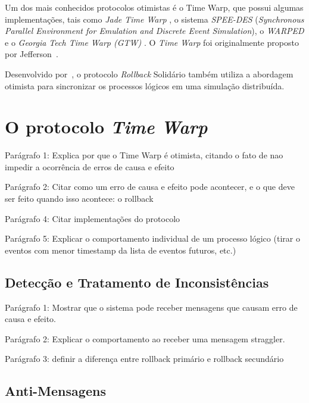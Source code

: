 
Um dos mais conhecidos protocolos otimistas é o Time Warp, que possui algumas implementações, tais como \textit{Jade Time Warp} \cite{BAEZNER1}, o sistema \textit{SPEE-DES} (\textit{Synchronous Parallel Environment for Emulation and Discrete Event Simulation})\cite{STEINMAN92}, o \textit{WARPED} \cite{WARPED} e o \textit{Georgia Tech Time Warp (GTW)} \cite{DAS94}. O \textit{Time Warp} foi originalmente proposto por Jefferson~\cite{JEFFERSON}.

Desenvolvido por~\cite{EDMARMO}, o protocolo \textit{Rollback} Solidário também utiliza a abordagem otimista para sincronizar os processos lógicos em uma simulação distribuída.

\section{O protocolo \textit{Time Warp}}

Parágrafo 1: Explica por que o Time Warp é otimista, citando o fato de nao impedir a ocorrência de erros de causa e efeito

Parágrafo 2: Citar como um erro de causa e efeito pode acontecer, e o que deve ser feito quando isso acontece: o rollback

Parágrafo 4: Citar implementações do protocolo

Parágrafo 5: Explicar o comportamento individual de um processo lógico (tirar o eventos com menor timestamp da lista de eventos futuros, etc.)

\subsection{Detecção e Tratamento de Inconsistências}

Parágrafo 1: Mostrar que o sistema pode receber mensagens que causam erro de causa e efeito.

Parágrafo 2: Explicar o comportamento ao receber uma mensagem straggler.

Parágrafo 3: definir a diferença entre rollback primário e rollback secundário

\subsection{Anti-Mensagens}

